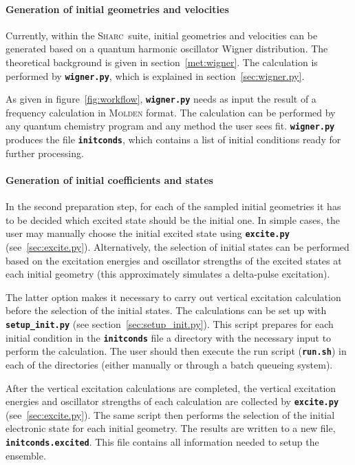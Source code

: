 \documentclass[a4paper,11pt,DIV=15,openany,twoside=false]{scrbook}
\newcommand{\sharc}{\textsc{Sharc}}
\newcommand{\todo}[1]{\textcolor{RL}{#1}}
\newcommand{\ttt}[1]{\textbf{\texttt{#1}}}
\begin{document}
\paragraph{Generation of initial geometries and velocities}

Currently, within the \sharc\ suite, initial geometries and velocities can be generated based on a quantum harmonic oscillator Wigner distribution. The theoretical background is given in section~\ref{met:wigner}. The calculation is performed by \ttt{wigner.py}, which is explained in section~\ref{sec:wigner.py}. 

As given in figure~\ref{fig:workflow}, \ttt{wigner.py} needs as input the result of a frequency calculation in \textsc{Molden} format. The calculation can be performed by any quantum chemistry program and any method the user sees fit. 
\ttt{wigner.py} produces the file \ttt{initconds}, which contains a list of initial conditions ready for further processing.

\paragraph{Generation of initial coefficients and states}

In the second preparation step, for each of the sampled initial geometries it has to be decided which excited state should be the initial one. In simple cases, the user may manually choose the initial excited state using \ttt{excite.py} (see~\ref{sec:excite.py}). Alternatively, the selection of initial states can be performed based on the excitation energies and oscillator strengths of the excited states at each initial geometry (\todo{this approximately simulates a delta-pulse excitation}). 

The latter option makes it necessary to carry out vertical excitation calculation before the selection of the initial states.
The calculations can be set up with \ttt{setup\_init.py} (see section~\ref{sec:setup_init.py}). This script prepares for each initial condition in the \ttt{initconds} file a directory with the necessary input to perform the calculation. The user should then execute the run script (\ttt{run.sh}) in each of the directories (either manually or through a batch queueing system).

After the vertical excitation calculations are completed, the vertical excitation energies and oscillator strengths of each calculation are collected by \ttt{excite.py} (see~\ref{sec:excite.py}). The same script then performs the selection of the initial electronic state for each initial geometry. The results are written to a new file, \ttt{initconds.excited}. This file contains all information needed to setup the ensemble. 
\end{document}
